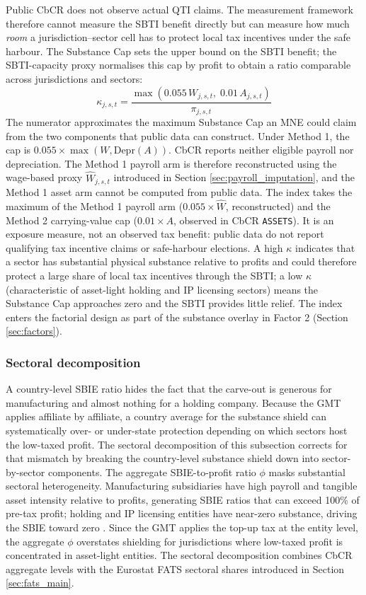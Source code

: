 \documentclass[11pt,a4paper]{article}
\newcommand{\code}[1]{\texttt{#1}}
\begin{document}
Public CbCR does not observe actual QTI claims. The measurement framework therefore cannot measure the SBTI benefit directly but can measure how much \emph{room} a jurisdiction--sector cell has to protect local tax incentives under the safe harbour. The Substance Cap sets the upper bound on the SBTI benefit; the SBTI-capacity proxy normalises this cap by profit to obtain a ratio comparable across jurisdictions and sectors:
\begin{equation}\label{eq:sbti_capacity}
\kappa_{j,s,t} = \frac{\max\!\left(0.055\,W_{j,s,t},\; 0.01\,A_{j,s,t}\right)}{\pi_{j,s,t}}
\end{equation}
The numerator approximates the maximum Substance Cap an MNE could claim from the two components that public data can construct. Under Method 1, the cap is $0.055 \times \max(W, \text{Depr}(A))$. CbCR reports neither eligible payroll nor depreciation. The Method 1 payroll arm is therefore reconstructed using the wage-based proxy $\hat{W}_{j,s,t}$ introduced in Section \ref{sec:payroll_imputation}, and the Method 1 asset arm cannot be computed from public data. The index takes the maximum of the Method 1 payroll arm ($0.055 \times \hat{W}$, reconstructed) and the Method 2 carrying-value cap ($0.01 \times A$, observed in CbCR \code{ASSETS}). It is an exposure measure, not an observed tax benefit: public data do not report qualifying tax incentive claims or safe-harbour elections. A high $\kappa$ indicates that a sector has substantial physical substance relative to profits and could therefore protect a large share of local tax incentives through the SBTI; a low $\kappa$ (characteristic of asset-light holding and IP licensing sectors) means the Substance Cap approaches zero and the SBTI provides little relief. The index enters the factorial design as part of the substance overlay in Factor 2 (Section \ref{sec:factors}).

\subsubsection{Sectoral decomposition}\label{sec:sbie_decomp}

A country-level SBIE ratio hides the fact that the carve-out is generous for manufacturing and almost nothing for a holding company. Because the GMT applies affiliate by affiliate, a country average for the substance shield can systematically over- or under-state protection depending on which sectors host the low-taxed profit. The sectoral decomposition of this subsection corrects for that mismatch by breaking the country-level substance shield down into sector-by-sector components. The aggregate SBIE-to-profit ratio $\phi$ masks substantial sectoral heterogeneity. Manufacturing subsidiaries have high payroll and tangible asset intensity relative to profits, generating SBIE ratios that can exceed 100\% of pre-tax profit; holding and IP licensing entities have near-zero substance, driving the SBIE toward zero \citep{devereux2023}. Since the GMT applies the top-up tax at the entity level, the aggregate $\phi$ overstates shielding for jurisdictions where low-taxed profit is concentrated in asset-light entities. The sectoral decomposition combines CbCR aggregate levels with the Eurostat FATS sectoral shares introduced in Section \ref{sec:fats_main}.
\end{document}
